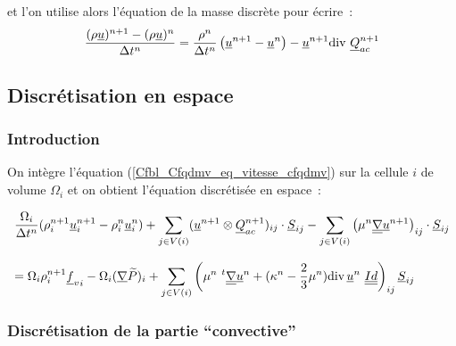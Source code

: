 et l'on utilise alors l'\'equation de la masse discr\`ete pour \'ecrire~:
\begin{equation}
\displaystyle
\frac{(\rho \underline{u})^{n+1} - (\rho \underline{u})^n}{\Delta t^n}
=
\frac{\rho^{n}}{\Delta t^n}\left(\underline{u}^{n+1} - \underline{u}^n\right)-
\underline{u}^{n+1}\text{div}\,\,\underline{Q}_{ac}^{n+1}
\end{equation}



\subsection*{Discr\'etisation en espace}

\subsubsection*{Introduction}

On int\`egre l'\'equation (\ref{Cfbl_Cfqdmv_eq_vitesse_cfqdmv})
sur la cellule $i$ de volume $\Omega_i$ et
on obtient l'\'equation discr\'etis\'ee en espace~:

\begin{equation}\label{Cfbl_Cfqdmv_eq_vitesse_discrete_cfqdmv}
\begin{array}{l}
\displaystyle\frac{\Omega_i}{\Delta t^n}
(\rho_i^{n+1}\underline{u}_i^{n+1}-\rho_i^n\underline{u}_i^n)
+ \displaystyle\sum\limits_{j\in V(i)}
(\underline{u}^{n+1} \otimes \underline{Q}_{ac}^{n+1})_{ij} \cdot \underline{S}_{ij}
- \displaystyle\sum\limits_{j\in V(i)}
\left(\mu^n\underline{\underline{{\nabla}}}{\underline{u}^{n+1}}\right)_{ij} \cdot \underline{S}_{ij}\\
\\
= \Omega_i\rho_i^{n+1} {\underline{f}_v}_i
- \Omega_i(\underline{\nabla}{\widetilde{P}})_i
+ \displaystyle\sum\limits_{j\in V(i)}
\left(\mu^n\ ^t\underline{\underline{{\nabla}}}{\underline{u}^n} + (\kappa^n-\frac{2}{3}\mu^n)
\text{div}\,{\underline{u}^n}\ \underline{\underline{Id}}\right)_{ij}\underline{S}_{ij}\\
\end{array}
\end{equation}

\subsubsection*{Discr\'etisation de la partie ``convective''}

